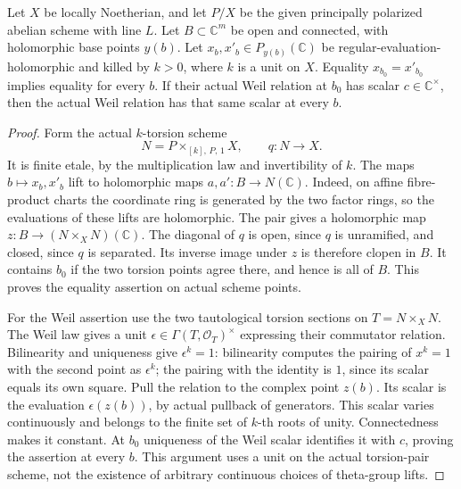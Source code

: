 \begin{lemma}
\label{lem:ftb-holomorphic-torsion-weil-constant}
Let \(X\) be locally Noetherian, and let \(P/X\) be the
given principally polarized abelian scheme with line \(L\).
Let \(B\subset\mathbb C^m\) be open and connected, with
holomorphic base points \(y(b)\).
Let \(x_b,x'_b\in P_{y(b)}(\mathbb C)\) be
regular-evaluation-holomorphic and killed by \(k>0\),
where \(k\) is a unit on \(X\).
Equality \(x_{b_0}=x'_{b_0}\) implies equality for every \(b\).
If their actual Weil relation at \(b_0\) has scalar
\(c\in\mathbb C^\times\), then the actual Weil relation
has that same scalar at every \(b\).
\end{lemma}
\begin{proof}
Form the actual \(k\)-torsion scheme
\[
             N=P\times_{[k],\,P,\,1}X,\qquad q:N\to X.
\]
It is finite etale, by the multiplication law and
invertibility of \(k\).
The maps \(b\mapsto x_b,x'_b\) lift to holomorphic maps
\(a,a':B\to N(\mathbb C)\).
Indeed, on affine fibre-product charts the coordinate
ring is generated by the two factor rings, so the
evaluations of these lifts are holomorphic.
The pair gives a holomorphic map
\(z:B\to(N\times_XN)(\mathbb C)\).
The diagonal of \(q\) is open, since \(q\) is unramified,
and closed, since \(q\) is separated.
Its inverse image under \(z\) is therefore clopen in \(B\).
It contains \(b_0\) if the two torsion points agree there,
and hence is all of \(B\).
This proves the equality assertion on actual scheme points.

For the Weil assertion use the two tautological torsion
sections on \(T=N\times_XN\).
The Weil law gives a unit \(\epsilon\in\Gamma(T,\mathcal O_T)^\times\)
expressing their commutator relation.
Bilinearity and uniqueness give \(\epsilon^k=1\):
bilinearity computes the pairing of \(x^k=1\) with the
second point as \(\epsilon^k\); the pairing with the
identity is \(1\), since its scalar equals its own square.
Pull the relation to the complex point \(z(b)\).
Its scalar is the evaluation \(\epsilon(z(b))\), by
actual pullback of generators.
This scalar varies continuously and belongs to the
finite set of \(k\)-th roots of unity.
Connectedness makes it constant.
At \(b_0\) uniqueness of the Weil scalar identifies it
with \(c\), proving the assertion at every \(b\).
This argument uses a unit on the actual torsion-pair
scheme, not the existence of arbitrary continuous
choices of theta-group lifts.
\end{proof}

